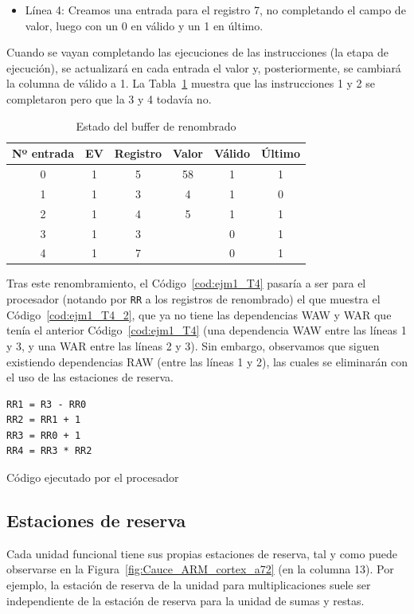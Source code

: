 \begin{ejemplo}
\begin{itemize}
        \item Línea 4: Creamos una entrada para el registro 7, no completando el campo de valor, luego con un 0 en válido y un 1 en último.
    \end{itemize}
    Cuando se vayan completando las ejecuciones de las instrucciones (la etapa de ejecución), se actualizará en cada entrada el valor y, posteriormente, se cambiará la columna de válido a 1. La Tabla~\ref{tab:ejm1_T4_2} muestra que las instrucciones 1 y 2 se completaron pero que la 3 y 4 todavía no.
    \begin{table}[H]
    \centering
    \begin{tabular}{|c|c|c|c|c|c|}
        \hline
        Nº entrada & EV & Registro & Valor & Válido & Último \\
        \hline
        0 & 1 & 5 & 58 & 1 & 1 \\
        \hline
        1 & 1 & 3 & 4 & 1 & 0 \\
        \hline
        2 & 1 & 4 & 5 & 1 & 1 \\
        \hline
        3 & 1 & 3 &   & 0 & 1 \\
        \hline
        4 & 1 & 7 &   & 0 & 1 \\
        \hline
    \end{tabular}
    \caption{Estado del buffer de renombrado}
    \label{tab:ejm1_T4_2}
    \end{table}
    Tras este renombramiento, el Código~\ref{cod:ejm1_T4} pasaría a ser para el procesador (notando por \verb|RR| a los registros de renombrado) el que muestra el Código~\ref{cod:ejm1_T4_2}, que ya no tiene las dependencias WAW y WAR que tenía el anterior Código~\ref{cod:ejm1_T4} (una dependencia WAW entre las líneas 1 y 3, y una WAR entre las líneas 2 y 3). Sin embargo, observamos que siguen existiendo dependencias RAW (entre las líneas 1 y 2), las cuales se eliminarán con el uso de las estaciones de reserva.
    \begin{listing}[H]
    \begin{verbatim}
RR1 = R3 - RR0        
RR2 = RR1 + 1
RR3 = RR0 + 1
RR4 = RR3 * RR2
    \end{verbatim}
    \caption{Código ejecutado por el procesador}
    \label{cod:ejm1_T4_2}
    \end{listing}
\end{ejemplo}

\subsection{Estaciones de reserva}
Cada unidad funcional tiene sus propias estaciones de reserva, tal y como puede observarse en la Figura~\ref{fig:Cauce_ARM_cortex_a72} (en la columna 13). Por ejemplo, la estación de reserva de la unidad para multiplicaciones suele ser independiente de la estación de reserva para la unidad de sumas y restas. 

